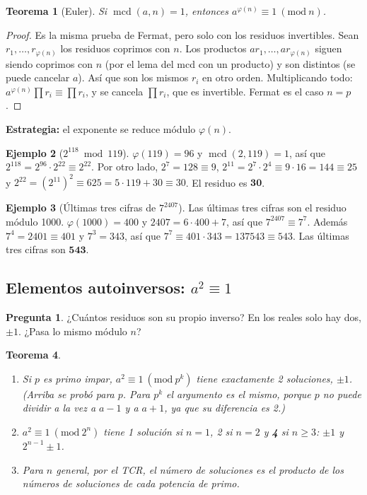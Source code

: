 \documentclass[11pt,a4paper]{article}
\newtheorem{teorema}{Teorema}[section]
\theoremstyle{definition}
\newtheorem{ejemplo}[teorema]{Ejemplo}
\newcommand{\md}[1]{\ (\mathrm{mod}\ #1)}
\newcommand{\mcd}{\operatorname{mcd}}
\theoremstyle{notait}
\newtheorem*{pregunta}{Pregunta}
\theoremstyle{nota}
\begin{document}
\begin{teorema}[Euler]
Si $\mcd(a,n)=1$, entonces $a^{\varphi(n)}\equiv1\md n$.
\end{teorema}
\begin{proof}
Es la misma prueba de Fermat, pero solo con los residuos invertibles. Sean $r_1,\dots,r_{\varphi(n)}$ los residuos coprimos con $n$. Los productos $ar_1,\dots,ar_{\varphi(n)}$ siguen siendo coprimos con $n$ (por el lema del mcd con un producto) y son distintos (se puede cancelar $a$). Así que son los mismos $r_i$ en otro orden. Multiplicando todo: $a^{\varphi(n)}\prod r_i\equiv\prod r_i$, y se cancela $\prod r_i$, que es invertible. Fermat es el caso $n=p$.
\end{proof}

\textbf{Estrategia:} el exponente se reduce módulo $\varphi(n)$.

\begin{ejemplo}[$2^{118}\bmod119$]
$\varphi(119)=96$ y $\mcd(2,119)=1$, así que $2^{118}=2^{96}\cdot2^{22}\equiv2^{22}$. Por otro lado, $2^7=128\equiv9$, $2^{11}=2^7\cdot2^4\equiv9\cdot16=144\equiv25$ y $2^{22}=(2^{11})^2\equiv625=5\cdot119+30\equiv30$. El residuo es $\mathbf{30}$.
\end{ejemplo}

\begin{ejemplo}[Últimas tres cifras de $7^{2407}$]
Las últimas tres cifras son el residuo módulo 1000. $\varphi(1000)=400$ y $2407=6\cdot400+7$, así que $7^{2407}\equiv7^7$. Además $7^4=2401\equiv401$ y $7^3=343$, así que $7^7\equiv401\cdot343=137543\equiv543$. Las últimas tres cifras son $\mathbf{543}$.
\end{ejemplo}

\subsection{Elementos autoinversos: $a^2\equiv1$}

\begin{pregunta}
¿Cuántos residuos son su propio inverso? En los reales solo hay dos, $\pm1$. ¿Pasa lo mismo módulo $n$?
\end{pregunta}

\begin{teorema}
\begin{enumerate}
\item Si $p$ es primo impar, $a^2\equiv1\md{p^k}$ tiene exactamente 2 soluciones, $\pm1$. (Arriba se probó para $p$. Para $p^k$ el argumento es el mismo, porque $p$ no puede dividir a la vez a $a-1$ y a $a+1$, ya que su diferencia es 2.)
\item $a^2\equiv1\md{2^n}$ tiene 1 solución si $n=1$, 2 si $n=2$ y \textbf{4} si $n\ge3$: $\pm1$ y $2^{n-1}\pm1$.
\item Para $n$ general, por el TCR, el número de soluciones es el producto de los números de soluciones de cada potencia de primo.
\end{enumerate}
\end{teorema}
\end{document}
